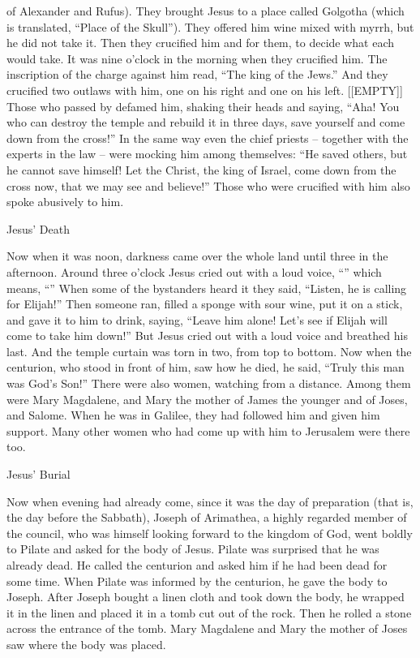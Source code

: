 {of Alexander
and
Rufus).
They brought
Jesus
to
a place
called Golgotha
(which
is
translated,
“Place
of
the Skull”).
They offered
him
wine
mixed with myrrh,
but
he did
not
take it.
Then
they crucified
him
and
{}
for
them,
to decide what
each would take.
It was
nine
o’clock
in the morning
when they crucified
him.
The inscription
of the charge
against him
read,
“The king
of the Jews.”
And
they crucified
two
outlaws
with
him,
one
on
his right
and
one
on
his
left.
[[EMPTY]]
Those who passed by
defamed
him,
shaking
their
heads
and
saying,
“Aha! You who can destroy
the temple
and
rebuild
it in
three
days,
save
yourself
and come down
from
the cross!”
In the same way
even
the chief priests
– together with
the experts in the law –
were mocking
him among
themselves: “He saved
others,
but he cannot
save
himself!
Let the Christ,
the king
of Israel,
come down
from
the cross
now,
that
we may see
and
believe!” Those who were crucified
with
him
also spoke abusively
to him.
\par }{\SH Jesus’ Death
\par }{\PP {}Now when it was
noon,
darkness
came
over
the whole
land
until
three in the afternoon.
Around three
o’clock
Jesus
cried out
with a loud
voice, “{}” which
means, “{}”
When
some
of the bystanders
heard
it they said,
“Listen,
he is calling
for Elijah!”
Then
someone
ran,
filled
a sponge
with sour wine,
put
it on
a stick,
and gave
it to him
to drink,
saying,
“Leave
him alone! Let’s see
if
Elijah
will come
to take
him
down!”
But
Jesus
cried out with a loud
voice
and breathed his last.
And
the temple
curtain
was torn
in
two,
from
top
to
bottom.
Now
when the centurion,
who stood
in
front
of him,
saw
how
he died,
he said,
“Truly
this
man
was
God’s
Son!”
There were
also
women,
watching
from
a distance.
Among
them
were Mary
Magdalene,
and
Mary
the mother
of James
the younger
and
of Joses,
and
Salome.
When
he was
in
Galilee,
they had followed
him
and
given
him
support.
Many
other
women who had come up
with him
to
Jerusalem were there too.
\par }{\SH Jesus’ Burial
\par }{\PP {}Now
when
evening
had
already
come,
since
it was
the day of preparation
(that
is,
the day before the Sabbath),
Joseph
of
Arimathea,
a
highly regarded
member of the council,
who
was
himself
looking forward
to the kingdom
of God,
went
boldly
to
Pilate
and
asked for
the body
of Jesus.
Pilate
was surprised
that he was
already
dead.
He
called
the centurion
and asked
him
if
he had been dead
for some time.
When
Pilate was informed
by
the centurion,
he gave
the body
to Joseph.
After
Joseph bought
a linen cloth
and took down
the body,
he wrapped
it in the linen
and
placed
it
in
a tomb
cut
out
of the rock.
Then
he rolled
a stone
across
the entrance
of the tomb.
Mary
Magdalene
and
Mary
the mother of Joses
saw
where
the body was placed.

}
